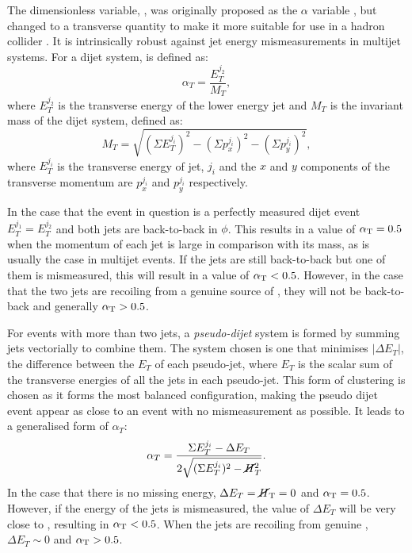 The dimensionless variable, \alphat, was originally proposed as the
$\alpha$ variable \cite{Randall:2008rw}, but changed to a transverse
quantity to make it more suitable for use in a hadron collider
\cite{CMS-PAS-SUS-08-005,CMS-PAS-SUS-09-001}. It is intrinsically
robust against jet energy mismeasurements in multijet systems. For a
dijet system, \alphat is defined as: 
\begin{equation}
\alpha_T=\frac{E_T^{j_2}}{M_T}, 
\end{equation} 
where $E_T^{j_2}$ is the transverse energy of the lower energy jet and
$M_T$ is the invariant mass of the dijet
system, defined as:
\begin{equation}
M_T=\sqrt{(\Sigma E_T^{j_i})^2-(\Sigma p_x^{j_i})^2-(\Sigma
p_y^{j_i})^2},
\end{equation}
where $E_T^{j_i}$ is the transverse energy of jet, $j_i$ and the $x$
and $y$ components of the transverse momentum are $p_x^{j_i}$ and
$p_y^{j_i}$ respectively.

In the case that the event in question is a perfectly measured dijet
event $E_T^{j_1}=E_T^{j_2}$ and both jets are back-to-back in $\phi$.
This results in a value of $\alpha_{\text{T}}=0.5$ when the momentum of each jet
is large in comparison with its mass, as is usually the case in
\QCD multijet events. If the jets are still back-to-back but one of
them is mismeasured, this will result in a value of $\alpha_{\text{T}}<0.5$.
However, in the case that the two jets are recoiling from a genuine
source of \MET, they will not be back-to-back and generally $\alpha_{\text{T}}>0.5$.

For events with more than two jets, a \emph{pseudo-dijet} system is
formed by summing jets vectorially to combine them.  The system chosen
is one that minimises $|\Delta E_T|$, the difference between the $E_T$
of each pseudo-jet, where $E_T$ is the scalar sum of the transverse
energies of all the jets in each pseudo-jet. This form of clustering
is chosen as it forms the most balanced configuration, making the
pseudo dijet event appear as close to an event with no mismeasurement
as possible. It leads to a generalised form of $\alpha_T$: 
\begin{equation}
\alpha_T=\frac{\Sigma E_T^{j_i}-\Delta
E_T}{2\sqrt{(\Sigma E_T^{j_i})^2-\cancel{H}_T^2}}.
\end{equation} 
In the case that there is no missing energy, $\Delta
E_T=\mbox{$\cancel{H}_\text{T}$}=0$ and $\alpha_{\text{T}}=0.5$. However, if the energy of the jets is
mismeasured, the value of $\Delta E_T$ will be very close to \MET,
resulting in $\alpha_{\text{T}}<0.5$. When the jets are recoiling from genuine
\MET, $\Delta E_T\sim 0$ and $\alpha_{\text{T}}>0.5$.
  
